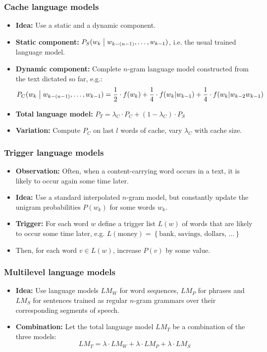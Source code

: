 \subsubsection{Cache language models}
\begin{itemize}
    \item \textbf{Idea:} Use a static and a dynamic component.
    \item \textbf{Static component:} $P_S(w_k \bigm| w_{k-(n-1)}, \ldots, w_{k-1})$, i.e. the usual trained language model.
    \item \textbf{Dynamic component:} Complete $n$-gram language model constructed from the text dictated so far, e.g.:
        \[
            P_C(w_k \bigm| w_{k-(n-1)}, \ldots, w_{k-1}) = \frac{1}{2} \cdot f(w_k) + \frac{1}{4} \cdot f(w_k | w_{k-1}) + \frac{1}{4} \cdot f(w_k | w_{k-2} w_{k-1})
        \]
    \item \textbf{Total language model:} $P_T = \lambda_C \cdot P_C + (1 - \lambda_C) \cdot P_S$
    \item \textbf{Variation:} Compute $P_C$ on last $l$ words of cache, vary $\lambda_C$ with cache size.
\end{itemize}

\subsubsection{Trigger language models}
\begin{itemize}
    \item \textbf{Observation:} Often, when a content-carrying word occurs in a text, it is likely to occur again some time later.
    \item \textbf{Idea:} Use a standard interpolated $n$-gram model, but constantly update the unigram probabilities $P(w_k)$ for some words $w_k$.
    \item \textbf{Trigger:} For each word $w$ define a trigger list $L(w)$ of words that are likely to occur some time later, e.g. $L(\mbox{money}) = \left\{\mbox{bank}, \, \mbox{savings}, \, \mbox{dollars}, \, \ldots \right\}$
    \item Then, for each word $v \in L(w)$, increase $P(v)$ by some value.
\end{itemize}

\subsubsection{Multilevel language models}
\begin{itemize}
    \item \textbf{Idea:} Use language models $LM_W$ for word sequences, $LM_P$ for phrases and $LM_S$ for sentences trained as regular $n$-gram grammars over their corresponding segments of speech.
    \item \textbf{Combination:} Let the total language model $LM_T$ be a combination of the three models:
        \[
        LM_T = \lambda \cdot LM_W + \lambda \cdot LM_P + \lambda \cdot LM_S
        \]
\end{itemize}

